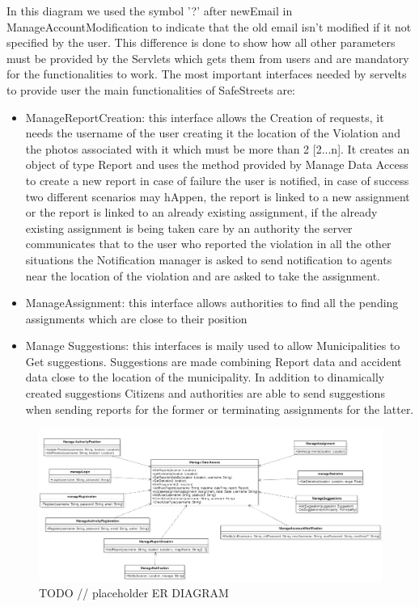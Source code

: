 In this diagram we used the symbol '?' after newEmail in ManageAccountModification to indicate that the old email isn't modified  if it not specified by the user. This difference is done to show how all other parameters must be provided by the Servlets which gets them from users and are mandatory for the functionalities to work.
The most important interfaces needed by servelts to provide user the main functionalities of SafeStreets are:
\begin{itemize}
\item ManageReportCreation: this interface allows the Creation of requests, it needs the username of the user creating it the location of the Violation and the photos associated with it which must be more than 2 [2...n]. It creates an object of type Report and uses the method provided by Manage Data Access to create a new report in case of failure the user is notified, in case of success two different scenarios may hAppen, the report is linked to a new assignment or the report is linked to an already existing assignment, if the already existing assignment is being taken care by an authority the server communicates that to the user who reported the violation in all the other situations the Notification manager is asked to send notification to agents near the location of the violation and are asked to take the assignment.
\item ManageAssignment: this interface allows authorities to find all the pending assignments which are close to their position
\item Manage Suggestions: this interfaces is maily used to allow Municipalities to Get suggestions. Suggestions are made combining Report data and accident data close to the location of the municipality. In addition to dinamically created suggestions Citizens and authorities are able to send suggestions when sending reports for the former or terminating assignments for the latter.
\end{itemize}
\begin{figure}[H]
\centering
\includegraphics[width=\textwidth]{Images/Interfaces.png}
\caption{\label{fig:ComWI}TODO // placeholder ER DIAGRAM }
\end{figure}
